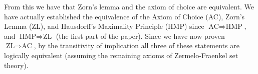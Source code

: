 \documentclass{article}
\theoremstyle{definition}
\begin{document}
            From this we have that Zorn's lemma and the axiom of choice are
            equivalent. We have actually established the equivalence of the
            Axiom of Choice (AC), Zorn's Lemma (ZL), and
            Hausdorff's Maximality Principle (HMP) since
            $\textrm{AC}\Rightarrow\textrm{HMP}$, and
            $\textrm{HMP}\Rightarrow\textrm{ZL}$ (the first part of the paper).
            Since we have now proven $\textrm{ZL}\Rightarrow\textrm{AC}$, by
            the transitivity of implication all three of these statements
            are logically equivalent (assuming the remaining axioms of
            Zermelo-Fraenkel set theory).
    
    
\end{document}

